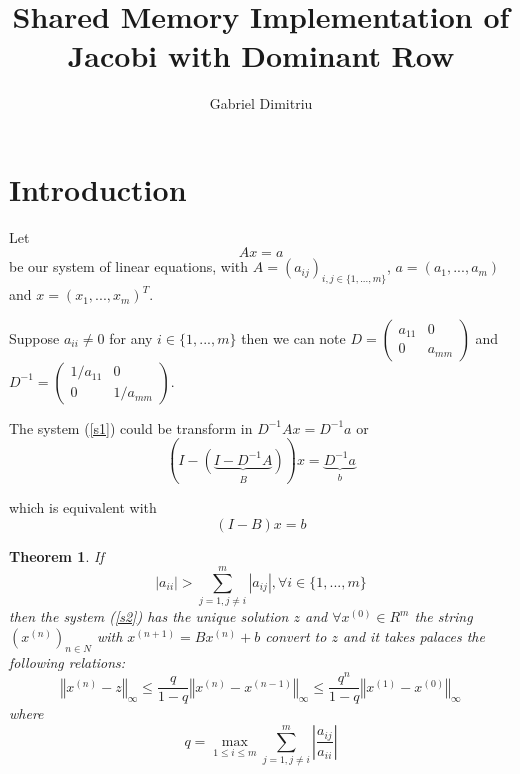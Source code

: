 \documentclass[a4paper]{article}
\newtheorem{theorem}{Theorem}
\begin{document}
\title{Shared Memory Implementation of Jacobi with Dominant Row}
\date{}
\author{Gabriel Dimitriu}
\maketitle

\section{Introduction}

Let 
\begin{equation}
Ax=a  \label{s1}
\end{equation}
be our system of linear equations, with $A=(a_{ij})_{i,j\in \{1,...,m\}}$, $%
a=(a_{1},...,a_{m})$ and $x=(x_{1},...,x_{m})^{T}$.

Suppose $a_{ii}\neq 0$ for any $i\in \{1,...,m\}$ then we can note $D=%
\begin{pmatrix}
a_{11} & 0 \\ 
0 & a_{mm}%
\end{pmatrix}%
$ and $D^{-1}=%
\begin{pmatrix}
1/a_{11} & 0 \\ 
0 & 1/a_{mm}%
\end{pmatrix}%
$.

The system (\ref{s1}) could be transform in $D^{-1}Ax=D^{-1}a$ or%
\begin{equation*}
\left( I-\underset{B}{\left( \underbrace{I-D^{-1}A}\right) }\right) x=%
\underset{b}{\underbrace{D^{-1}a}}
\end{equation*}

which is equivalent with%
\begin{equation}
(I-B)x=b  \label{s2}
\end{equation}

\begin{theorem}
If 
\begin{equation}
\left\vert a_{ii}\right\vert >\sum_{j=1,j\neq i}^{m}\left\vert
a_{ij}\right\vert ,\forall i\in \{1,...,m\}  \label{s3}
\end{equation}%
then the system (\ref{s2}) has the unique solution $z$ and $\forall
x^{(0)}\in R^{m}$ the string $(x^{(n)})_{n\in N}$ with $x^{(n+1)}=Bx^{(n)}+b$
convert to $z$ and it takes palaces the following relations: 
\begin{equation}
\left\Vert x^{(n)}-z\right\Vert _{\infty }\leq \frac{q}{1-q}\left\Vert
x^{(n)}-x^{(n-1)}\right\Vert _{\infty }\leq \frac{q^{n}}{1-q}\left\Vert
x^{(1)}-x^{(0)}\right\Vert _{\infty }  \label{s4}
\end{equation}%
where 
\begin{equation*}
q=\max_{1\leq i\leq m}\sum_{j=1,j\neq i}^{m}\left\vert \frac{a_{ij}}{a_{ii}}%
\right\vert
\end{equation*}
\end{theorem}
\end{document}

